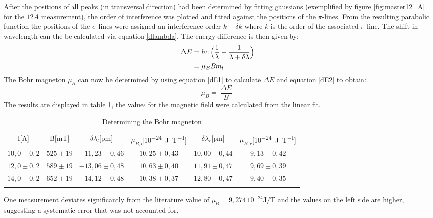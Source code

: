\documentclass[12pt]{article}
\begin{document}
	After the positions of all peaks (in transversal direction) had been determined by fitting gaussians (exemplified by figure \ref{fig:master12_A} for the $12A$ measurement), the order of interference was plotted and fitted against the positions of the $\pi$-lines. From the resulting parabolic function the positions of the $\sigma$-lines were assigned an interference order $k+\delta k$ where $k$ is the order of the associated $\pi$-line. The shift in wavelength can the be calculated via equation \ref{dlambda}. The energy difference is then given by:
	\begin{align}
		\Delta E&=hc\;\Bigl(\frac{1}{\lambda}-\frac{1}{\lambda+\delta \lambda} \Bigr) 
		\label{dE1}\\
		&=\mu_BBm_l
		\label{dE2}
	\end{align}
	The Bohr magneton $\mu_B$ can now be determined by using equation \ref{dE1} to calculate $\Delta E$ and equation \ref{dE2} to obtain:
	\begin{equation}	
		\mu_B=\biggl| \frac{\Delta E}{B}\biggr|
	\end{equation}
	The results are displayed in table \ref{resultsP1}, the values for the magnetic field were calculated from the linear fit.
	\begin{table}[H]
		\centering
		\begin{tabular}{cccccc}
			I[\si{\ampere}]&B[\si{\milli\tesla}]&$\delta\lambda_l$[\si{\pico\metre}]&$\mu_{B,l}$[\si{10^{-24}\joule\per\tesla}]&$\delta\lambda_r$[\si{\pico\metre}]&$\mu_{B,r}$[\si{10^{-24}\joule\per\tesla}]\\
			$10,0\pm 0,2$&$525\pm 19$&$-11,23\pm 0,46$&$10,25\pm 0,43$&$10,00\pm 0,44$&$9,13\pm 0,42$\\
			$12,0\pm 0,2$&$589\pm 19$&$-13,06\pm 0,48$&$10,63\pm 0,40$&$11,91\pm 0,47$&$9,69\pm 0,39$\\
			$14,0\pm 0,2$&$652\pm 19$&$-14,12\pm 0,48$&$10,38\pm 0,37$&$12,80\pm 0,47$&$9,40\pm 0,35$\\
			\label{resultsP1}
		\end{tabular}
		\caption{Determining the Bohr magneton}
	\end{table}
One measurement deviates significantly from the literature value of $\mu_B=9,274\, 10^{-24}\si{\joule\per\tesla}$ and the values on the left side are higher, suggesting a systematic error that was not accounted for.
\end{document}
